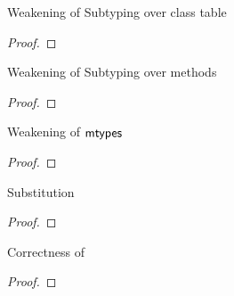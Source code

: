 \documentclass[acmlarge, anonymous, authordraft, review]{acmart} %
\begin{document}
\begin{lemma}{Weakening of Subtyping over class table}{}
  \begin{conds}
    \cond{$\StrSub\M{\K}\t\tp$}
  \end{conds}

  \then\axiom{$\StrSub\M{\K~\Kp}\t\tp$}

  \begin{proof} 
  \end{proof}
\end{lemma}

\begin{lemma}{Weakening of Subtyping over methods}{}
  \begin{conds}
    \cond{$\StrSub\M{\K}\t\tp$}
  \end{conds}

  \then{}

  \begin{proof} 
  \end{proof}
\end{lemma}

\begin{lemma}{Weakening of ${\sf{mtypes}}$}{}
  \begin{conds}
    \cond{$\Mtype\m{\HT\x\t}\tp \in \App\K\C$}
  \end{conds}

  \then{}

  \begin{proof} \innat
  \end{proof}
\end{lemma}

\begin{lemma}{Substitution}{}
  \begin{conds}
    \cond{$\EnvType{\b{\HT\x\tp}}\s\K\e\t$}    
    \cond{$\b{\EnvType\cdot\s\K\a\tp}$}
  \end{conds}

  \then\axiom{$\EnvType\cdot\s\K{[\a/\x]\e}\t$}

  \begin{proof} 
  \end{proof}
\end{lemma}

\begin{lemma}{Correctness of \App\K\C}{}
  \begin{conds}
    \cond{$\Mtype\m{\t}\tp \in \App\K\C$}    
    \cond{$\EnvType\cdot\s\K\a\C$}
    \cond{$\EnvType\cdot\s\K\ap\t$}
    \cond{$\EnvType\cdot\s\K\epp\tp$}
  \end{conds}

  \then\axiom{$\Reduce \K{\KCall\a\m{\ap}{\t}{\tp}}\s \K\epp\s$}

  \begin{proof} \innat
  \end{proof}
\end{lemma}
\end{document}

